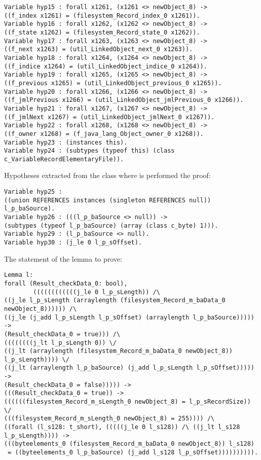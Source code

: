 \begin{lstlisting}
Variable hyp15 : forall x1261, (x1261 <> newObject_8) ->
((f_index x1261) = (filesystem_Record_index_0 x1261)).
Variable hyp16 : forall x1262, (x1262 <> newObject_8) ->
((f_state x1262) = (filesystem_Record_state_0 x1262)).
Variable hyp17 : forall x1263, (x1263 <> newObject_8) ->
((f_next x1263) = (util_LinkedObject_next_0 x1263)).
Variable hyp18 : forall x1264, (x1264 <> newObject_8) ->
((f_indice x1264) = (util_LinkedObject_indice_0 x1264)).
Variable hyp19 : forall x1265, (x1265 <> newObject_8) ->
((f_previous x1265) = (util_LinkedObject_previous_0 x1265)).
Variable hyp20 : forall x1266, (x1266 <> newObject_8) ->
((f_jmlPrevious x1266) = (util_LinkedObject_jmlPrevious_0 x1266)).
Variable hyp21 : forall x1267, (x1267 <> newObject_8) ->
((f_jmlNext x1267) = (util_LinkedObject_jmlNext_0 x1267)).
Variable hyp22 : forall x1268, (x1268 <> newObject_8) ->
((f_owner x1268) = (f_java_lang_Object_owner_0 x1268)).
Variable hyp23 : (instances this).
Variable hyp24 : (subtypes (typeof this) (class c_VariableRecordElementaryFile)).
\end{lstlisting}
Hypotheses extracted from the class where is performed the proof:
\begin{lstlisting}
Variable hyp25 : 
((union REFERENCES instances (singleton REFERENCES null)) l_p_baSource).
Variable hyp26 : (((l_p_baSource <> null)) ->
(subtypes (typeof l_p_baSource) (array (class c_byte) 1))).
Variable hyp29 : (l_p_baSource <> null).
Variable hyp30 : (j_le 0 l_p_sOffset).
\end{lstlisting}
The statement of the lemma to prove:
\begin{lstlisting}
Lemma l:
forall (Result_checkData_0: bool),
        ((((((((((((j_le 0 l_p_sLength)) /\ 
((j_le l_p_sLength (arraylength (filesystem_Record_m_baData_0 newObject_8)))))) /\ 
((j_le (j_add l_p_sLength l_p_sOffset) (arraylength l_p_baSource))))) ->
(Result_checkData_0 = true))) /\ 
((((((((j_lt l_p_sLength 0)) \/ 
((j_lt (arraylength (filesystem_Record_m_baData_0 newObject_8)) l_p_sLength)))) \/ 
((j_lt (arraylength l_p_baSource) (j_add l_p_sLength l_p_sOffset))))) ->
(Result_checkData_0 = false))))) ->
(((Result_checkData_0 = true)) ->
((((((filesystem_Record_m_sLength_0 newObject_8) = l_p_sRecordSize)) \/ 
(((filesystem_Record_m_sLength_0 newObject_8) = 255)))) /\ 
((forall (l_s128: t_short), (((((j_le 0 l_s128)) /\ ((j_lt l_s128 l_p_sLength)))) ->
(((byteelements_0 (filesystem_Record_m_baData_0 newObject_8)) l_s128)
 = ((byteelements_0 l_p_baSource) (j_add l_s128 l_p_sOffset)))))))))).
\end{lstlisting}
